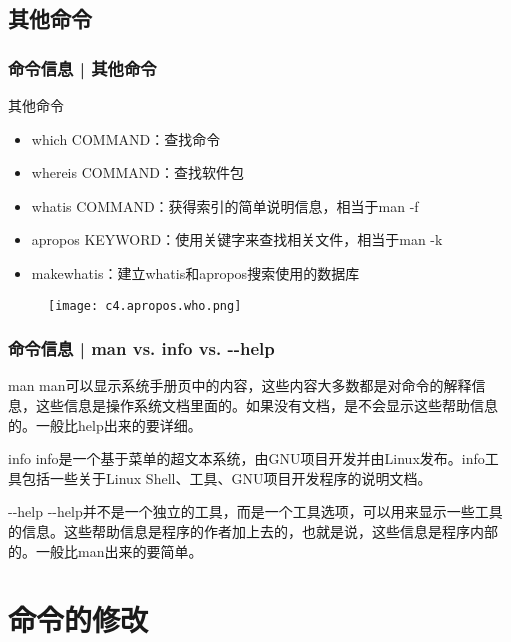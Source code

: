 \subsection{其他命令}
\begin{frame}
  \frametitle{命令信息 | 其他命令}
  \begin{block}{其他命令}
    \begin{itemize}
      \item which COMMAND：查找命令
      \item whereis COMMAND：查找软件包
      \item whatis COMMAND：获得索引的简单说明信息，相当于man -f
      \item apropos KEYWORD：使用关键字来查找相关文件，相当于man -k
      \item makewhatis：建立whatis和apropos搜索使用的数据库
    \end{itemize}
  \end{block}
  \begin{figure}
    \centering
    \texttt{[image: c4.apropos.who.png]}
  \end{figure}
\end{frame}

\begin{frame}[fragile]
  \frametitle{命令信息 | man vs. info vs. -\!-help}
  \begin{block}{man}
    man可以显示系统手册页中的内容，这些内容大多数都是对命令的解释信息，这些信息是操作系统文档里面的。如果没有文档，是不会显示这些帮助信息的。一般比help出来的要详细。
  \end{block}
  \pause
  \begin{block}{info}
    info是一个基于菜单的超文本系统，由GNU项目开发并由Linux发布。info工具包括一些关于Linux Shell、工具、GNU项目开发程序的说明文档。
  \end{block}
  \pause
  \begin{block}{-\!-help}
-\!-help并不是一个独立的工具，而是一个工具选项，可以用来显示一些工具的信息。这些帮助信息是程序的作者加上去的，也就是说，这些信息是程序内部的。一般比man出来的要简单。
  \end{block}
\end{frame}

\section{命令的修改}
